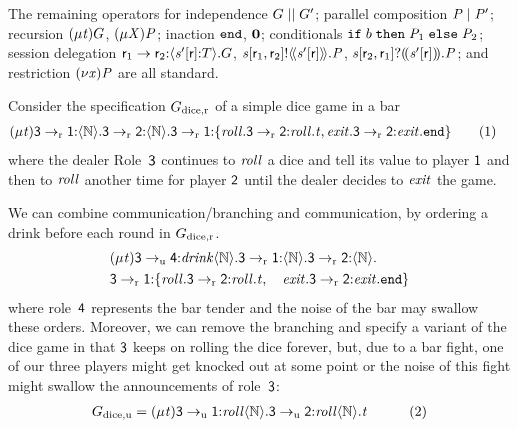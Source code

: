 The remaining operators for independence $ \GPar{\GT}{\GT'} $; parallel composition $ \PPar{\PT}{\PT'} $; recursion $ \GRep{\TypeV}{\GT} $, $ \PRep{\ProcV}{\PT} $; inaction $ \GEnd $, $ \PEnd $; conditionals $ \PITE{\Expr[b]}{\PT_1}{\PT_2} $; session delegation $ \GDel{\Role_1}{\Role_2}{\Chan'}{\Role}{\LT}{\GT} $, $ \PDelA{\Chan}{\Role_1}{\Role_2}{\AT{\Chan'}{\Role}}{\PT} $, $ \PDelB{\Chan}{\Role_2}{\Role_1}{\AT{\Chan'}{\Role}}{\PT} $; and restriction $ \PRes{\Args}{\PT} $ are all standard.

Consider the specification $ \GDice $ of a simple dice game in a bar
\begin{align*}
	\GRep{\TypeV}{\GComR{\Role[3]}{\Role[1]}{\nat}{\GComR{\Role[3]}{\Role[2]}{\nat}{\GBranR{\Role[3]}{\Role[1]}{{\Set{\Label[roll].\GBranR{\Role[3]}{\Role[2]}{\Label[roll].\TypeV}, \Label[exit].\GBranR{\Role[3]}{\Role[2]}{\Label[exit].\GEnd}}}}}}} & \tag{1}\label{eq:diceG}
\end{align*}
where the dealer Role~$ \Role[3] $ continues to $ \Label[roll] $ a dice and tell its value to player $ \Role[1] $ and then to $ \Label[roll] $ another time for player $ \Role[2] $ until the dealer decides to $ \Label[exit] $ the game.

We can combine \strongR communication/branching and \unrel communication, \eg by ordering a drink before each round in $ \GDice $.
\begin{align*}
	& \GRep{\TypeV}{\GComU{\Role[3]}{\Role[4]}{\Label[drink]}{\nat}{\GComR{\Role[3]}{\Role[1]}{\nat}{\GComR{\Role[3]}{\Role[2]}{\nat}{}}}}\\
	& \GBranR{\Role[3]}{\Role[1]}{{\Set{\Label[roll].\GBranR{\Role[3]}{\Role[2]}{\Label[roll].\TypeV}, \quad \Label[exit].\GBranR{\Role[3]}{\Role[2]}{\Label[exit].\GEnd}}}}
\end{align*}
where role~$ \Role[4] $ represents the bar tender and the noise of the bar may swallow these orders.
Moreover, we can remove the branching and specify a variant of the dice game in that $ \Role[3] $ keeps on rolling the dice forever, but, \eg due to a bar fight, one of our three players might get knocked out at some point or the noise of this fight might swallow the announcements of role~$ \Role[3] $:
\begin{align*}
	\GDiceUC &= \GRep{\TypeV}{\GComU{\Role[3]}{\Role[1]}{\Label[roll]}{\nat}{\GComU{\Role[3]}{\Role[2]}{\Label[roll]}{\nat}{\TypeV}}} & \tag{2}\label{eq:diceGU}
\end{align*}

